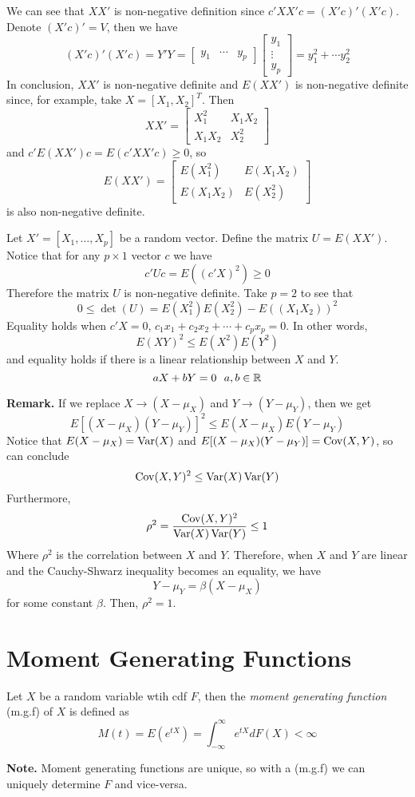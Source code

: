 We can see that $XX'$ is non-negative definition since $c'XX'c = (X'c)'(X'c)$. Denote $(X'c)' = V$, then we have 
\[(X'c)'(X'c) = Y'Y = \begin{bmatrix}
    y_1 & \cdots & y_p
\end{bmatrix}\begin{bmatrix}
    y_1 \\ \vdots \\ y_p
\end{bmatrix} = y_1^2 + \cdots y_2^2\]
In conclusion, $XX'$ is non-negative definite and $E(XX')$ is non-negative definite since, for example, take $X = [X_1, X_2]^T$. Then 
\[XX' = \begin{bmatrix}
    X_1^2 & X_1X_2\\
    X_1X_2 & X_2^2
\end{bmatrix}\]
and $c'E(XX')c = E(c'XX'c) \geq 0$, so  
\[E(XX') = \begin{bmatrix}
    E(X_1^2) & E(X_1X_2)\\
    E(X_1X_2) & E(X_2^2)
\end{bmatrix}\]
is also non-negative definite.

\begin{theorem}
    Let $X' = [X_1, \ldots, X_p]$ be a random vector. Define the matrix $U = E(XX')$. Notice that for any $p \times 1$ vector $c$ we have 
    \[c'Uc = E((c'X)^2) \geq 0\]
    Therefore the matrix $U$ is non-negative definite. Take $p = 2$ to see that 
    \[0 \leq \det(U) = E(X_1^2)E(X_2^2) - E((X_1X_2))^2\]
    Equality holds when $c'X = 0$, $c_1x_1 + c_2x_2 + \cdots + c_px_p = 0$. In other words, 
    \[E(XY)^2 \leq E(X^2)E(Y^2)\]
    and equality holds if there is a linear relationship between $X$ and $Y$.
    \[aX + bY = 0 \ \ a,b \in \mathbb{R}\]
\end{theorem}
\noindent
\textbf{Remark.} If we replace $X \rightarrow (X-\mu_X)$ and $Y \rightarrow (Y-\mu_Y)$, then we get
\[E[(X-\mu_X)(Y-\mu_Y)]^2 \leq E(X-\mu_X)E(Y-\mu_Y)\]
Notice that $E(X-\mu_X) = \operatorname{Var}(X)$ and $E[(X-\mu_X)(Y-\mu_Y)] = \operatorname{Cov}(X,Y)$, so can conclude 
\[\operatorname{Cov}(X,Y)^2 \leq \operatorname{Var}(X)\operatorname{Var}(Y)\]
Furthermore, 
\[\rho^2 = \frac{\operatorname{Cov}(X,Y)^2}{\operatorname{Var}(X)\operatorname{Var}(Y)} \leq 1\]
Where $\rho^2$ is the correlation between $X$ and $Y$. Therefore, when $X$ and $Y$ are linear and the Cauchy-Shwarz inequality becomes an equality, we have 
\[Y - \mu_Y = \beta(X - \mu_X)\]
for some constant $\beta$. Then, $\rho^2 = 1$.  
\section{Moment Generating Functions}
\begin{definition}
    Let $X$ be a random variable wtih cdf $F$, then the \emph{moment generating function} (m.g.f) of $X$ is defined as
    \[M(t) = E(e^{tX}) = \int_{-\infty}^\infty e^{tX}dF(X) < \infty\]
\end{definition}
\noindent
\textbf{Note.} Moment generating functions are unique, so with a (m.g.f) we can uniquely determine $F$ and vice-versa. 
